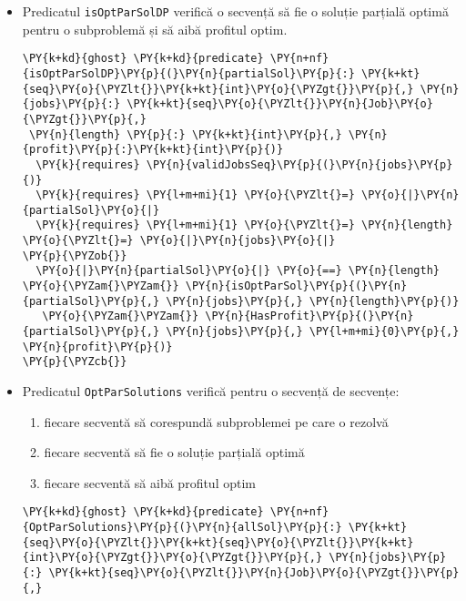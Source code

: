 \begin{itemize}
\begin{Verbatim}[commandchars=\\\{\}, fontsize=\footnotesize]
   \PY{o}{==}\PY{o}{\PYZgt{}} \PY{n}{HasLessProf}\PY{p}{(}\PY{n}{otherSol}\PY{p}{,} \PY{n}{jobs}\PY{p}{,}
    \PY{n}{PartialSolProfit}\PY{p}{(}\PY{n}{partialSol}\PY{p}{,} \PY{n}{jobs}\PY{p}{,} \PY{l+m+mi}{0}\PY{p}{)}\PY{p}{,} \PY{l+m+mi}{0}\PY{p}{)}
\PY{p}{\PYZcb{}}
\end{Verbatim}
    \item Predicatul \texttt{isOptParSolDP} verifică o secvență să fie o soluție parțială optimă pentru o subproblemă și să aibă profitul optim.
    \begin{Verbatim}[commandchars=\\\{\}, fontsize=\footnotesize]
\PY{k+kd}{ghost} \PY{k+kd}{predicate} \PY{n+nf}{isOptParSolDP}\PY{p}{(}\PY{n}{partialSol}\PY{p}{:} \PY{k+kt}{seq}\PY{o}{\PYZlt{}}\PY{k+kt}{int}\PY{o}{\PYZgt{}}\PY{p}{,} \PY{n}{jobs}\PY{p}{:} \PY{k+kt}{seq}\PY{o}{\PYZlt{}}\PY{n}{Job}\PY{o}{\PYZgt{}}\PY{p}{,}
 \PY{n}{length} \PY{p}{:} \PY{k+kt}{int}\PY{p}{,} \PY{n}{profit}\PY{p}{:}\PY{k+kt}{int}\PY{p}{)}
  \PY{k}{requires} \PY{n}{validJobsSeq}\PY{p}{(}\PY{n}{jobs}\PY{p}{)}
  \PY{k}{requires} \PY{l+m+mi}{1} \PY{o}{\PYZlt{}=} \PY{o}{|}\PY{n}{partialSol}\PY{o}{|}
  \PY{k}{requires} \PY{l+m+mi}{1} \PY{o}{\PYZlt{}=} \PY{n}{length} \PY{o}{\PYZlt{}=} \PY{o}{|}\PY{n}{jobs}\PY{o}{|}
\PY{p}{\PYZob{}}
  \PY{o}{|}\PY{n}{partialSol}\PY{o}{|} \PY{o}{==} \PY{n}{length} \PY{o}{\PYZam{}\PYZam{}} \PY{n}{isOptParSol}\PY{p}{(}\PY{n}{partialSol}\PY{p}{,} \PY{n}{jobs}\PY{p}{,} \PY{n}{length}\PY{p}{)}
   \PY{o}{\PYZam{}\PYZam{}} \PY{n}{HasProfit}\PY{p}{(}\PY{n}{partialSol}\PY{p}{,} \PY{n}{jobs}\PY{p}{,} \PY{l+m+mi}{0}\PY{p}{,}  \PY{n}{profit}\PY{p}{)}
\PY{p}{\PYZcb{}}
\end{Verbatim}
    \item 
    Predicatul \texttt{OptParSolutions} verifică pentru o secvență de secvențe:
\begin{enumerate}
    \item fiecare secventă să corespundă subproblemei pe care o rezolvă
    \item fiecare secventă să fie o soluție parțială optimă
    \item fiecare secventă să aibă profitul optim
\end{enumerate}
\begin{Verbatim}[commandchars=\\\{\}, fontsize=\footnotesize]
\PY{k+kd}{ghost} \PY{k+kd}{predicate} \PY{n+nf}{OptParSolutions}\PY{p}{(}\PY{n}{allSol}\PY{p}{:} \PY{k+kt}{seq}\PY{o}{\PYZlt{}}\PY{k+kt}{seq}\PY{o}{\PYZlt{}}\PY{k+kt}{int}\PY{o}{\PYZgt{}}\PY{o}{\PYZgt{}}\PY{p}{,} \PY{n}{jobs}\PY{p}{:} \PY{k+kt}{seq}\PY{o}{\PYZlt{}}\PY{n}{Job}\PY{o}{\PYZgt{}}\PY{p}{,}

\end{Verbatim}
\end{itemize}
